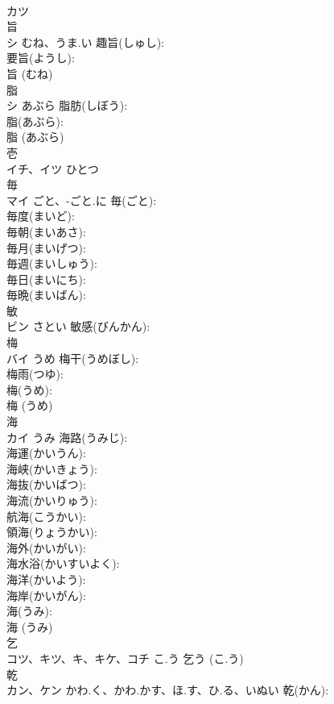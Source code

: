 \documentclass[8pt]{extreport}
\begin{document}
\begin{CJK}{UTF8}{min}
\\	カツ			
\\	旨			
\\	シ	むね、うま.い	趣旨(しゅし): 
\\	要旨(ようし): 
\\	旨 (むね)
\\	脂			
\\	シ	あぶら	脂肪(しぼう): 
\\	脂(あぶら): 
\\	脂 (あぶら)
\\	壱			
\\	イチ、イツ	ひとつ		
\\	毎			
\\	マイ	ごと、-ごと.に	毎(ごと): 
\\	毎度(まいど): 
\\	毎朝(まいあさ): 
\\	毎月(まいげつ): 
\\	毎週(まいしゅう): 
\\	毎日(まいにち): 
\\	毎晩(まいばん): 
\\	敏			
\\	ビン	さとい	敏感(びんかん): 
\\	梅		
\\	バイ	うめ	梅干(うめぼし): 
\\	梅雨(つゆ): 
\\	梅(うめ): 
\\	梅 (うめ)
\\	海			
\\	カイ	うみ	海路(うみじ): 
\\	海運(かいうん): 
\\	海峡(かいきょう): 
\\	海抜(かいばつ): 
\\	海流(かいりゅう): 
\\	航海(こうかい): 
\\	領海(りょうかい): 
\\	海外(かいがい): 
\\	海水浴(かいすいよく): 
\\	海洋(かいよう): 
\\	海岸(かいがん): 
\\	海(うみ): 
\\	海 (うみ)
\\	乞		
\\	コツ、キツ、キ、キケ、コチ	こ.う		乞う (こ.う)
\\	乾			
\\	カン、ケン	かわ.く、かわ.かす、ほ.す、ひ.る、いぬい	乾(かん): 

\end{CJK}
\end{document}
